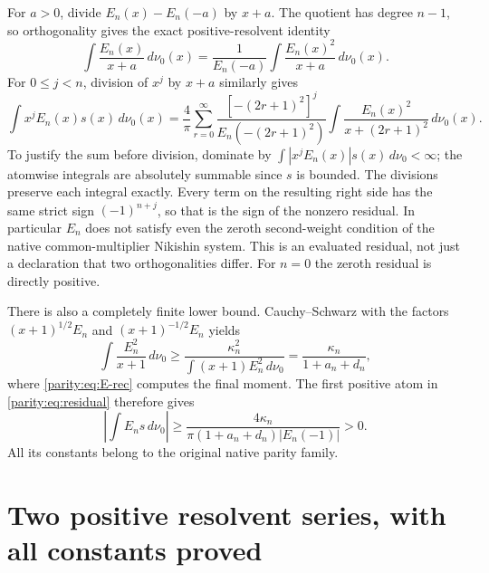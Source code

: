 \documentclass[11pt]{article}
\begin{document}
For $a>0$, divide $E_n(x)-E_n(-a)$ by $x+a$. The quotient has
degree $n-1$, so orthogonality gives the exact positive-resolvent
identity
\begin{equation}\label{parity:eq:residual-atom}
 \int\frac{E_n(x)}{x+a}\,d\nu_0(x)
  =\frac1{E_n(-a)}\int\frac{E_n(x)^2}{x+a}\,d\nu_0(x).
\end{equation}
For $0\leq j<n$, division of $x^j$ by $x+a$ similarly gives
\begin{equation}\label{parity:eq:residual}
 \int x^jE_n(x)s(x)\,d\nu_0(x)
 =\frac4\pi\sum_{r=0}^{\infty}
 \frac{[-(2r+1)^2]^j}{E_n(-(2r+1)^2)}
 \int\frac{E_n(x)^2}{x+(2r+1)^2}\,d\nu_0(x).
\end{equation}
To justify the sum before division, dominate by
$\int|x^jE_n(x)|s(x)\,d\nu_0<\infty$; the atomwise integrals are
absolutely summable since $s$ is bounded. The divisions preserve
each integral exactly. Every term on the resulting right side
has the same strict sign $(-1)^{n+j}$, so that is the sign of the
nonzero residual. In particular $E_n$ does not satisfy even the
zeroth second-weight condition of the native common-multiplier
Nikishin system. This is an evaluated residual, not just a
declaration that two orthogonalities differ. For $n=0$ the
zeroth residual is directly positive.

There is also a completely finite lower bound. Cauchy--Schwarz
with the factors $(x+1)^{1/2}E_n$ and $(x+1)^{-1/2}E_n$ yields
\[
 \int\frac{E_n^2}{x+1}\,d\nu_0
 \geq\frac{\kappa_n^2}{\int(x+1)E_n^2\,d\nu_0}
 =\frac{\kappa_n}{1+a_n+d_n},
\]
where \eqref{parity:eq:E-rec} computes the final moment. The first
positive atom in \eqref{parity:eq:residual} therefore gives
\begin{equation}\label{parity:eq:residual-lower}
 \left|\int E_n s\,d\nu_0\right|
 \geq\frac{4\kappa_n}{\pi(1+a_n+d_n)|E_n(-1)|}>0.
\end{equation}
All its constants belong to the original native parity family.

\section{Two positive resolvent series, with all constants proved}
\end{document}
